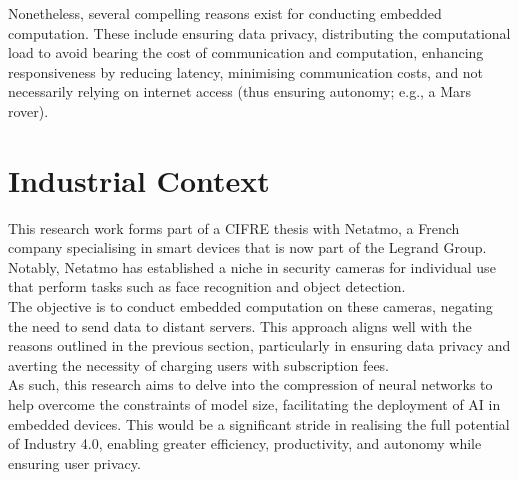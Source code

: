 
Nonetheless, several compelling reasons exist for conducting embedded
computation. These include ensuring data privacy, distributing the computational
load to avoid bearing the cost of communication and computation, enhancing
responsiveness by reducing latency, minimising communication costs, and not
necessarily relying on internet access (thus ensuring autonomy; e.g., a Mars
rover).\\

\section{Industrial Context}


This research work forms part of a CIFRE thesis with Netatmo, a French company
specialising in smart devices that is now part of the Legrand Group. Notably,
Netatmo has established a niche in security cameras for individual use that
perform tasks such as face recognition and object detection.\\

The objective is to conduct embedded computation on these cameras, negating the
need to send data to distant servers. This approach aligns well with the reasons
outlined in the previous section, particularly in ensuring data privacy and
averting the necessity of charging users with subscription fees.\\

As such, this research aims to delve into the compression of neural networks to
help overcome the constraints of model size, facilitating the deployment of \ac{AI}
in embedded devices. This would be a significant stride in realising the full
potential of Industry 4.0, enabling greater efficiency, productivity, and
autonomy while ensuring user privacy.\\


